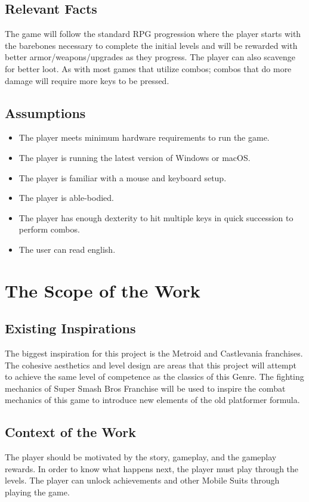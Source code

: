 \documentclass{article}
\begin{document}
    \subsection{Relevant Facts}
        The game will follow the standard RPG progression where the player starts with the barebones necessary to complete the initial levels and will be rewarded with better armor/weapons/upgrades as they progress. The player can also scavenge for better loot.
        As with most games that utilize combos; combos that do more damage will require more keys to be pressed.
    \subsection{Assumptions}
        \begin{itemize}
            \item The player meets minimum hardware requirements to run the game. 
            \item The player is running the latest version of Windows or macOS.
            \item The player is familiar with a mouse and keyboard setup. 
            \item The player is able-bodied. 
            \item The player has enough dexterity to hit multiple keys in quick succession to perform combos.
            \item The user can read english.
        \end{itemize}

\section{The Scope of the Work}
    \subsection{Existing Inspirations}
    The biggest inspiration for this project is the Metroid and Castlevania franchises. The cohesive aesthetics and level design are areas that this project will attempt to achieve the same level of competence as the classics of this Genre. The fighting mechanics of Super Smash Bros Franchise will be used to inspire the combat mechanics of this game to introduce new elements of the old platformer formula.
    \subsection{Context of the Work}
    The player should be motivated by the story, gameplay, and the gameplay rewards. In order to know what happens next, the player must play through the levels. The player can unlock achievements and other Mobile Suits through playing the game.
    
\end{document}
